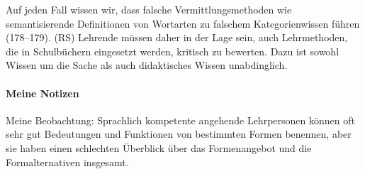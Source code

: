 Auf jeden Fall wissen wir, dass falsche Vermittlungsmethoden wie semantisierende Definitionen von Wortarten zu falschem Kategorienwissen führen (178--179). (RS) Lehrende müssen daher in der Lage sein, auch Lehrmethoden, die in Schulbüchern eingesetzt werden, kritisch zu bewerten. Dazu ist sowohl Wissen um die Sache als auch didaktisches Wissen unabdinglich.




\paragraph{Meine Notizen}

Meine Beobachtung: Sprachlich kompetente angehende Lehrpersonen können oft sehr gut Bedeutungen und Funktionen von bestimmten Formen benennen, aber sie haben einen schlechten Überblick über das Formenangebot und die Formalternativen insgesamt.



















